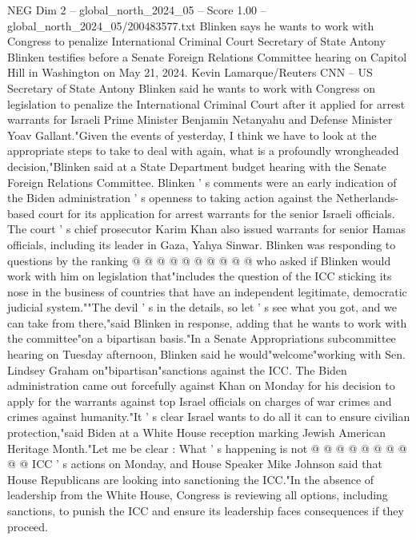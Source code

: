 \begin{textsample}{NEG Dim 2 – global\_north\_2024\_05 – Score 1.00 – global\_north\_2024\_05/200483577.txt}  \label{ex:f2_neg_153}
Blinken says he wants to work with Congress to penalize International Criminal Court Secretary of State Antony Blinken testifies before a Senate Foreign Relations Committee hearing on Capitol Hill in Washington on May 21, 2024.
Kevin Lamarque/Reuters CNN -- US Secretary of State Antony Blinken said he wants to work with Congress on legislation to penalize the International Criminal Court after it applied for arrest warrants for Israeli Prime Minister Benjamin Netanyahu and Defense Minister Yoav Gallant."Given the events of yesterday, I think we have to look at the appropriate steps to take to deal with again, what is a profoundly wrongheaded decision,"Blinken said at a State Department budget hearing with the Senate Foreign Relations Committee.
Blinken ' s comments were an early indication of the Biden administration ' s openness to taking action against the Netherlands-based court for its application for arrest warrants for the senior Israeli officials.
The court ' s chief prosecutor Karim Khan also issued warrants for senior Hamas officials, including its leader in Gaza, Yahya Sinwar.
Blinken was responding to questions by the ranking @ @ @ @ @ @ @ @ @ @ who asked if Blinken would work with him on legislation that"includes the question of the ICC sticking its nose in the business of countries that have an independent legitimate, democratic judicial system.""The devil ' s in the details, so let ' s see what you got, and we can take from there,"said Blinken in response, adding that he wants to work with the committee"on a bipartisan basis."In a Senate Appropriations subcommittee hearing on Tuesday afternoon, Blinken said he would"welcome"working with Sen.
Lindsey Graham on"bipartisan"sanctions against the ICC.
The Biden administration came out forcefully against Khan on Monday for his decision to apply for the warrants against top Israel officials on charges of war crimes and crimes against humanity."It ' s clear Israel wants to do all it can to ensure civilian protection,"said Biden at a White House reception marking Jewish American Heritage Month."Let me be clear : What ' s happening is not @ @ @ @ @ @ @ @ @ @ ICC ' s actions on Monday, and House Speaker Mike Johnson said that House Republicans are looking into sanctioning the ICC."In the absence of leadership from the White House, Congress is reviewing all options, including sanctions, to punish the ICC and ensure its leadership faces consequences if they proceed.

\end{textsample}
